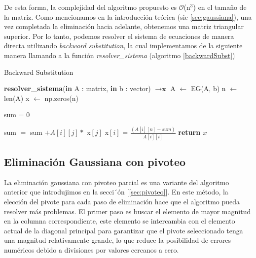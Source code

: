 De esta forma, la complejidad del algoritmo propuesto es $\mathcal{O}$(n$^3$) en el tamaño de la matriz.
Como mencionamos en la introducción teórica (sic \ref{sec:gaussiana}), una vez completada la eliminación hacia adelante, obtenemos una matriz triangular superior. Por lo tanto, podemos resolver el sistema de ecuaciones de manera directa utilizando \textit{backward substitution}, la cual implementamos de la siguiente manera llamando a la función \textit{resolver\_sistema} (algoritmo \ref{backwardSubst})

\begin{algorithm}
\caption{Backward Substitution}\label{backwardSubst}
\begin{algorithmic}
\State \textbf{resolver\_sistema}(\textbf{in} A : matrix, \textbf{in} b : vector) $\to \textbf{x}$
 \State A $\gets$ EG(A, b) 
\State n $\gets$ len(A)
\State x $\gets$ np.zeros(n)

    \State sum = 0
        
            \State sum $=$ sum $+ A[i][j] *$ x$[j]$
        \EndIf       
        \State x$[i]$ = $\frac{(A[i][n] - sum)}{A[i][i]}$
    \EndFor
\EndFor
\State \textbf{return $x$}
\end{algorithmic}
\end{algorithm}



\subsection{Eliminación Gaussiana con pivoteo} 
\label{seccion_EG_pivot}

La eliminación gaussiana con pivoteo parcial es una variante del algoritmo anterior que introdujimos en la secci´ón [\ref{sec:pivoteo}].
En este método, la elección del pivote para cada paso de eliminación hace que el algoritmo pueda resolver más problemas. El primer paso es buscar el elemento de mayor magnitud en la columna correspondiente, este elemento se intercambia con el elemento actual de la diagonal principal para garantizar que el pivote seleccionado tenga una magnitud relativamente grande, lo que reduce la posibilidad de errores numéricos debido a divisiones por valores cercanos a cero. 

